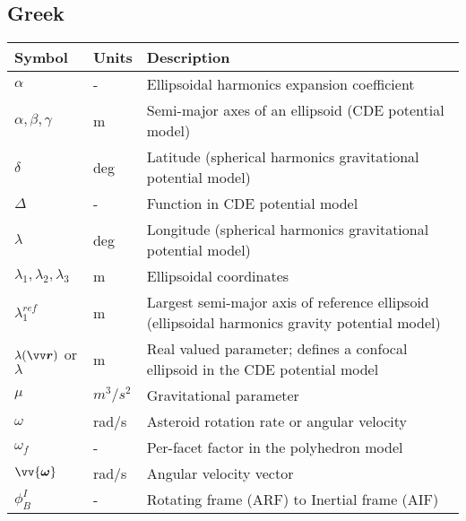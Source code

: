 \subsection*{Greek}
\begin{longtable}[l]{p{100pt} p{70pt} p{150pt}}
    \textbf{Symbol} & \textbf{Units} & \textbf{Description}                                 \\
    \hline
    $\alpha$            & -               & Ellipsoidal harmonics expansion coefficient     \\
    $\alpha, \beta, \gamma$ & m           & Semi-major axes of an ellipsoid
                                            (CDE potential model)                           \\
    $\delta$            & deg             & Latitude (spherical harmonics
                                            gravitational potential model)                  \\
    $\Delta$            & -               & Function in CDE potential model                 \\
    $\lambda$           & deg             & Longitude (spherical harmonics
                                            gravitational potential model)                  \\
    $\lambda_1, \lambda_2, \lambda_3$ & m & Ellipsoidal coordinates                         \\
    $\lambda_1^{ref}$   & m               & Largest semi-major axis of reference ellipsoid
                                            (ellipsoidal harmonics gravity potential model) \\
    $\lambda(\bvector{r})$ or $\lambda$ & m & Real valued parameter; defines a confocal
                                              ellipsoid in the CDE potential model          \\
    $\mu$               & $m^3/s^2$       & Gravitational parameter                         \\
    $\omega$            & rad/s           & Asteroid rotation rate or angular
                                            velocity                                        \\
    $\omega_f$          & -               & Per-facet factor in the polyhedron model        \\
    $\vv{\bm{\omega}}$  & rad/s           & Angular velocity vector                         \\
    $\phi_{B}^{I}$      & -               & Rotating frame (ARF) to Inertial frame (AIF)

\end{longtable}
